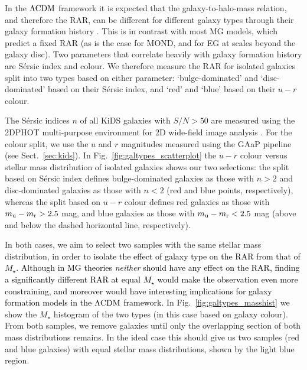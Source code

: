 \documentclass[usenatbib]{mnras}
\newcommand{\lcdm}{{\rm \Lambda CDM}}
\newcommand{\un}[1]{_{\rm #1}}
\begin{document}
In the $\lcdm$ framework it is expected that the galaxy-to-halo-mass relation, and therefore the RAR, can be different for different galaxy types through their galaxy formation history \cite[]{dutton2010,matthee2017,posti2019,marasco2020}. This is in contrast with most MG models, which predict a fixed RAR (as is the case for MOND, and for EG at scales beyond the galaxy disc). Two parameters that correlate heavily with galaxy formation history are S\'ersic index and colour. We therefore measure the RAR for isolated galaxies split into two types based on either parameter: `bulge-dominated' and `disc-dominated' based on their S\'ersic index, and `red' and `blue' based on their $u-r$ colour.

The S\'ersic indices $n$ of all KiDS galaxies with $S/N > 50$ \citep[following][]{roy2018} are measured using the \textsc{2DPHOT} multi-purpose environment for 2D wide-field image analysis \cite[]{barbera2008}. For the colour split, we use the $u$ and $r$ magnitudes measured using the GAaP pipeline (see Sect.~\ref{sec:kids}). In Fig.~\ref{fig:galtypes_scatterplot} the $u-r$ colour versus stellar mass distribution of isolated galaxies shows our two selections: the split based on S\'ersic index defines bulge-dominated galaxies as those with $n > 2$ and disc-dominated galaxies as those with $n<2$ (red and blue points, respectively), whereas the split based on $u-r$ colour defines red galaxies as those with $m\un{u} - m\un{r} > 2.5$ mag, and blue galaxies as those with $m\un{u} - m\un{r} < 2.5$ mag (above and below the dashed horizontal line, respectively).

In both cases, we aim to select two samples with the same stellar mass distribution, \textcolor{black}{in order to isolate the effect of galaxy type on the RAR from that of $M_\star$. Although in MG theories \emph{neither} should have any effect on the RAR, finding a significantly different RAR at equal $M_\star$ would make the observation even more constraining, and moreover would have interesting implications for galaxy formation models in the $\lcdm$ framework.} In Fig.~\ref{fig:galtypes_masshist} we show the $M_\star$ histogram of the two types (in this case based on galaxy colour). From both samples, we remove galaxies until only the overlapping section of both mass distributions remains. In the ideal case this should give us two samples (red and blue galaxies) with equal stellar mass distributions, shown by the light blue region.
\end{document}

